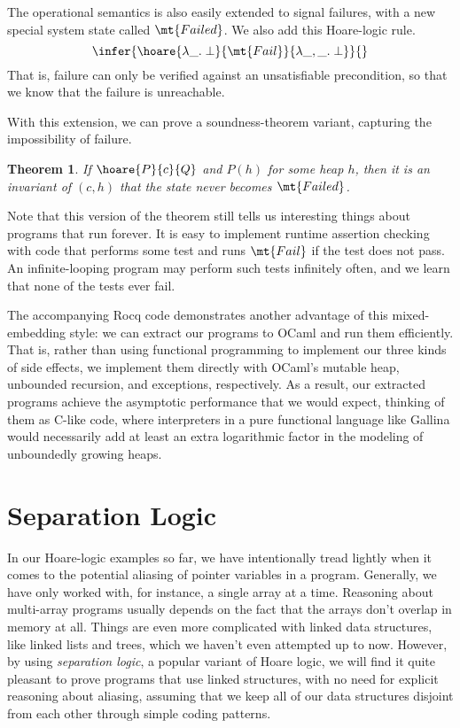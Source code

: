 \documentclass{amsbook}
\newtheorem{theorem}{Theorem}[chapter]
\theoremstyle{definition}
\theoremstyle{remark}
\numberwithin{section}{chapter}
\numberwithin{equation}{chapter}
\begin{document}
The operational semantics is also easily extended to signal failures, with a new special system state called $\mt{Failed}$.
We also add this Hoare-logic rule.
$$\infer{\hoare{\lambda \_. \; \bot}{\mt{Fail}}{\lambda \_, \_. \; \bot}}{}$$
That is, failure can only be verified against an unsatisfiable precondition, so that we know that the failure is unreachable.

With this extension, we can prove a soundness-theorem variant, capturing the impossibility of failure.

\invariants
\begin{theorem}
  If $\hoare{P}{c}{Q}$ and $P(h)$ for some heap $h$, then it is an invariant of $(c, h)$ that the state never becomes $\mt{Failed}$.
\end{theorem}

Note that this version of the theorem still tells us interesting things about programs that run forever.
It is easy to implement runtime assertion checking with code that performs some test and runs $\mt{Fail}$ if the test does not pass.
An infinite-looping program may perform such tests infinitely often, and we learn that none of the tests ever fail.

The accompanying Rocq code demonstrates another advantage of this mixed-embedding style: we can extract our programs to OCaml and run them efficiently.
That is, rather than using functional programming to implement our three kinds of side effects, we implement them directly with OCaml's mutable heap, unbounded recursion, and exceptions, respectively.
As a result, our extracted programs achieve the asymptotic performance that we would expect, thinking of them as C-like code, where interpreters in a pure functional language like Gallina would necessarily add at least an extra logarithmic factor in the modeling of unboundedly growing heaps.



\chapter{Separation Logic}\label{seplog}

In our Hoare-logic examples so far, we have intentionally tread lightly when it comes to the potential aliasing of pointer variables in a program.
Generally, we have only worked with, for instance, a single array at a time.
Reasoning about multi-array programs usually depends on the fact that the arrays don't overlap in memory at all.
Things are even more complicated with linked data structures, like linked lists and trees, which we haven't even attempted up to now.
However, by using \emph{separation logic}, a popular variant of Hoare logic, we will find it quite pleasant to prove programs that use linked structures, with no need for explicit reasoning about aliasing, assuming that we keep all of our data structures disjoint from each other through simple coding patterns.
\end{document}
